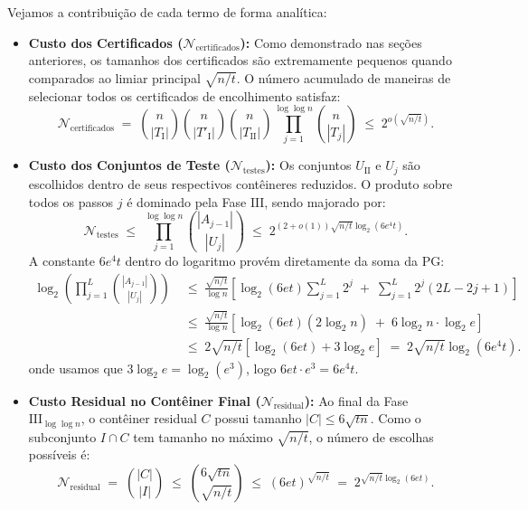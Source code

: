 \documentclass[reqno,a4paper,12pt]{amsart}
\begin{document}
Vejamos a contribuição de cada termo de forma analítica:
\begin{itemize}
  \item \textbf{Custo dos Certificados ($\mathcal{N}_{\text{certificados}}$):}
        Como demonstrado nas seções anteriores, os tamanhos dos certificados são extremamente pequenos quando comparados ao limiar principal $\sqrt{n/t}$. O número acumulado de maneiras de selecionar todos os certificados de encolhimento satisfaz:
        \[
          \mathcal{N}_{\text{certificados}} \;=\; \binom{n}{|T_{\mathrm{I}}|} \binom{n}{|T'_{\mathrm{I}}|} \binom{n}{|T_{\mathrm{II}}|} \prod_{j=1}^{\log\log n} \binom{n}{|T_j|} \;\leq\; 2^{o(\sqrt{n/t})}.
        \]

  \item \textbf{Custo dos Conjuntos de Teste ($\mathcal{N}_{\text{testes}}$):}
        Os conjuntos $U_{\mathrm{II}}$ e $U_j$ são escolhidos dentro de seus respectivos contêineres reduzidos. O produto sobre todos os passos $j$ é dominado pela Fase $\mathrm{III}$, sendo majorado por:
        \[
          \mathcal{N}_{\text{testes}} \;\le\; \prod_{j=1}^{\log\log n} \binom{|A_{j-1}|}{|U_j|} \;\le\; 2^{(2+o(1)) \sqrt{n/t} \log_2(6e^4 t)}.
        \]
        A constante $6e^4 t$ dentro do logaritmo provém diretamente da soma da PG:
        \begin{align*}
          \log_2 \left( \prod_{j=1}^{L} \binom{|A_{j-1}|}{|U_j|} \right)
           & \;\le\; \frac{\sqrt{n/t}}{\log n} \left[ \log_2(6e t) \sum_{j=1}^L 2^j \;+\; \sum_{j=1}^L 2^j (2L - 2j + 1) \right] \\
           & \;\le\; \frac{\sqrt{n/t}}{\log n} \left[ \log_2(6e t) (2\log_2 n) \;+\; 6\log_2 n \cdot \log_2 e \right]            \\
           & \;\le\; 2\sqrt{n/t} \left[ \log_2(6e t) + 3\log_2 e \right] \;=\; 2\sqrt{n/t} \log_2(6e^4 t).
        \end{align*}
        onde usamos que $3\log_2 e = \log_2(e^3)$, logo $6et \cdot e^3 = 6e^4 t$.

  \item \textbf{Custo Residual no Contêiner Final ($\mathcal{N}_{\text{residual}}$):}
        Ao final da Fase $\mathrm{III}_{\log\log n}$, o contêiner residual $C$ possui tamanho $|C| \le 6\sqrt{t n}$. Como o subconjunto $I \cap C$ tem tamanho no máximo $\sqrt{n/t}$, o número de escolhas possíveis é:
        \[
          \mathcal{N}_{\text{residual}} \;=\; \binom{|C|}{|I|} \;\le\; \binom{6\sqrt{t n}}{\sqrt{n/t}} \;\le\; \left( 6e t \right)^{\sqrt{n/t}} \;=\; 2^{\sqrt{n/t} \log_2(6e t)}.
        \]
\end{itemize}
\end{document}
